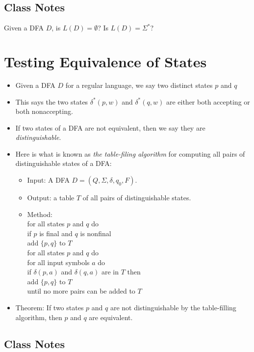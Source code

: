 \documentclass[]{article}
\begin{document}
  \subsection{Class Notes}
    Given a DFA $D$, is $L(D) = \emptyset$? Is $L(D) = \Sigma^*$?


\section{Testing Equivalence of States}
  \begin{itemize}
    \item Given a DFA $D$ for a regular language, we say two distinct states
    $p$ and $q$
    \item This says the two states $\delta^*(p, w)$ and $\delta^*(q, w)$ are
    either both accepting or both nonaccepting.
    \item If two states of a DFA are not equivalent, then we say they are
    \emph{distinguishable}.
    \item Here is what is known as \emph{the table-filing algorithm} for
    computing all pairs of distinguishable states of a DFA:
      \begin{itemize}
        \item Input: A DFA $D = (Q, \Sigma, \delta, q_0, F)$.
        \item Output: a table $T$ of all pairs of distinguishable states.
        \item Method: \\
        for all states $p$ and $q$ do \\
        \indent \quad if $p$ is final and $q$ is nonfinal \\
        \indent \quad \quad add $\{p, q\}$ to $T$ \\
        \indent for all states $p$ and $q$ do \\
        \indent \quad for all input symbols $a$ do \\
        \indent\quad\quad if $\delta(p,a)$ and $\delta(q,a)$ are in $T$ then \\
        \indent\quad\quad\quad add $\{p, q\}$ to $T$ \\
        until no more pairs can be added to $T$
      \end{itemize}
    \item Theorem: If two states $p$ and $q$ are not distinguishable by the
    table-filling algorithm, then $p$ and $q$ are equivalent.
  \end{itemize}
  \subsection{Class Notes}
\end{document}
